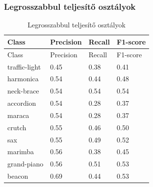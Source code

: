 \subsubsection{Legrosszabbul teljesítő osztályok}
\begin{center}
  \begin{longtable}{llll}
  \caption{Legrosszabbul teljesítő osztályok}\label{tab:phase02_EfficientNet-B0_legrosszabb_osztlyok}\\
  \toprule
  Class & Precision & Recall & F1-score \\
  \midrule
  \endfirsthead
  \toprule
  Class & Precision & Recall & F1-score \\
  \midrule
  \endhead
  traffic-light & 0.45 & 0.38 & 0.41 \\
  harmonica & 0.54 & 0.44 & 0.48 \\
  neck-brace & 0.54 & 0.54 & 0.54 \\
  accordion & 0.54 & 0.28 & 0.37 \\
  maraca & 0.54 & 0.28 & 0.37 \\
  crutch & 0.55 & 0.46 & 0.50 \\
  sax & 0.55 & 0.49 & 0.52 \\
  marimba & 0.56 & 0.38 & 0.45 \\
  grand-piano & 0.56 & 0.51 & 0.53 \\
  beacon & 0.69 & 0.44 & 0.53 \\
  \bottomrule
  \end{longtable}
  \end{center}
  
